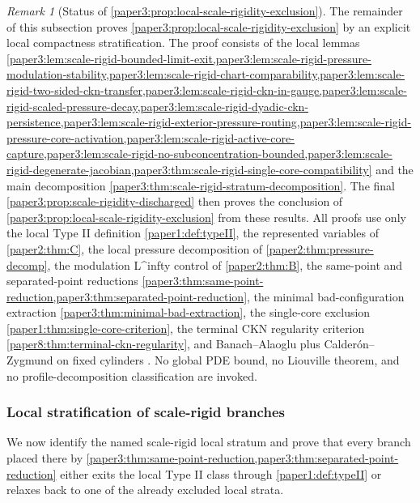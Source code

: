 \documentclass[11pt]{amsart}
\def\({}%
\def\){}%
\def\infty{infty}%
\theoremstyle{plain}
\theoremstyle{definition}
\theoremstyle{remark}
\newtheorem{remark}[remark]{Remark}
\begin{document}
\begin{remark}[Status of \cref{paper3:prop:local-scale-rigidity-exclusion}]
\label{paper3:rem:scale-rigidity-discharge}
The remainder of this subsection proves
\cref{paper3:prop:local-scale-rigidity-exclusion} by an explicit local compactness
stratification.  The proof consists of the local lemmas
\cref{paper3:lem:scale-rigid-bounded-limit-exit,paper3:lem:scale-rigid-pressure-modulation-stability,paper3:lem:scale-rigid-chart-comparability,paper3:lem:scale-rigid-two-sided-ckn-transfer,paper3:lem:scale-rigid-ckn-in-gauge,paper3:lem:scale-rigid-scaled-pressure-decay,paper3:lem:scale-rigid-dyadic-ckn-persistence,paper3:lem:scale-rigid-exterior-pressure-routing,paper3:lem:scale-rigid-pressure-core-activation,paper3:lem:scale-rigid-active-core-capture,paper3:lem:scale-rigid-no-subconcentration-bounded,paper3:lem:scale-rigid-degenerate-jacobian,paper3:thm:scale-rigid-single-core-compatibility}
and the main decomposition
\cref{paper3:thm:scale-rigid-stratum-decomposition}.  The final
\cref{paper3:prop:scale-rigidity-discharged} then proves the conclusion of
\cref{paper3:prop:local-scale-rigidity-exclusion} from these results.  All proofs use only the
local Type II definition \cref{paper1:def:typeII}, the represented variables of
\cref{paper2:thm:C}, the local pressure decomposition of
\cref{paper2:thm:pressure-decomp}, the modulation \(L^\infty\) control of
\cref{paper2:thm:B}, the same-point and separated-point reductions
\cref{paper3:thm:same-point-reduction,paper3:thm:separated-point-reduction},
the minimal bad-configuration extraction
\cref{paper3:thm:minimal-bad-extraction}, the single-core exclusion
\cref{paper1:thm:single-core-criterion}, the terminal CKN regularity criterion
\cref{paper8:thm:terminal-ckn-regularity}, and Banach--Alaoglu plus
Calder\'on--Zygmund on fixed cylinders \cite{CalderonZygmund1952,Stein1970}.
No global PDE bound, no Liouville theorem, and no profile-decomposition
classification are invoked.
\end{remark}

\subsubsection{Local stratification of scale-rigid branches}

We now identify the named scale-rigid local stratum and prove that every
branch placed there by
\cref{paper3:thm:same-point-reduction,paper3:thm:separated-point-reduction}
either exits the local Type II class through
\cref{paper1:def:typeII} or relaxes back to one of the already excluded local
strata.
\end{document}
